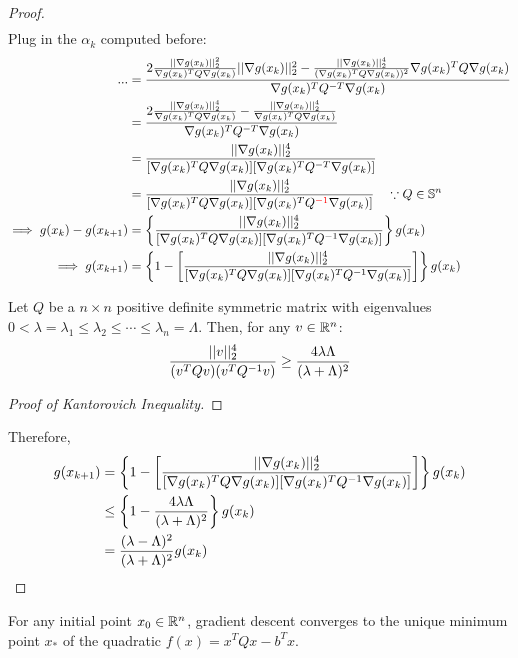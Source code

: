 \documentclass{article}
\begin{document}
\begin{proof}
\begin{align}
		\end{align}
		Plug in the $\alpha_k$ computed before:
		\begin{align}
			... &= \frac{2 \frac{\vert \vert {\nabla g(x_k)} \vert \vert_2^2}{\nabla g(x_k)^T Q \nabla g(x_k)} \vert \vert {\nabla g(x_k)} \vert \vert_2^2 -  \frac{\vert \vert {\nabla g(x_k)} \vert \vert_2^4}{(\nabla g(x_k)^T Q \nabla g(x_k))^2} \nabla g(x_k)^T Q \nabla g(x_k)}{\nabla g(x_k)^T Q^{-T} \nabla g(x_k)} \\
			&= \frac{2 \frac{\vert \vert {\nabla g(x_k)} \vert \vert_2^4}{\nabla g(x_k)^T Q \nabla g(x_k)} - \frac{\vert \vert {\nabla g(x_k)} \vert \vert_2^4}{\nabla g(x_k)^T Q \nabla g(x_k)}}{\nabla g(x_k)^T Q^{-T} \nabla g(x_k)} \\
			&= \frac{\vert \vert {\nabla g(x_k)} \vert \vert_2^4}{[\nabla g(x_k)^T Q \nabla g(x_k)][\nabla g(x_k)^T Q^{-T} \nabla g(x_k)]} \\
			&=\frac{\vert \vert {\nabla g(x_k)} \vert \vert_2^4}{[\nabla g(x_k)^T Q \nabla g(x_k)][\nabla g(x_k)^T Q^{\textcolor{red}{-1}} \nabla g(x_k)]} \quad \because Q \in \mathbb{S}^n \\
			\implies g(x_k) - g(x_{k+1}) &= \left \{
				\frac{\vert \vert {\nabla g(x_k)} \vert \vert_2^4}{[\nabla g(x_k)^T Q \nabla g(x_k)][\nabla g(x_k)^T Q^{-1} \nabla g(x_k)]}
			\right \} g(x_k) \\
			\implies g(x_{k+1}) &= \left \{1 - \left [
				\frac{\vert \vert {\nabla g(x_k)} \vert \vert_2^4}{[\nabla g(x_k)^T Q \nabla g(x_k)][\nabla g(x_k)^T Q^{-1} \nabla g(x_k)]}
			\right ] \right \} g(x_k)
		\end{align}
		\begin{lemma}
			Let $Q$ be a $n\times n$ positive definite symmetric matrix with eigenvalues $0 < \lambda = \lambda_1 \leq \lambda_2 \leq \cdots \leq \lambda_n = \Lambda$. Then, for any $v \in \mathbb{R}^n$:
			\begin{align}
				\frac{\vert \vert {v} \vert \vert^4_2}{(v^T Q v)(v^T Q^{-1} v)} \geq \frac{4 \lambda \Lambda}{(\lambda + \Lambda)^2}
			\end{align}
		\end{lemma}
		\begin{proof}[Proof of Kantorovich Inequality]
		\end{proof}
		Therefore, 
		\begin{align}
			g(x_{k+1}) &= \left \{1 - \left [
				\frac{\vert \vert {\nabla g(x_k)} \vert \vert_2^4}{[\nabla g(x_k)^T Q \nabla g(x_k)][\nabla g(x_k)^T Q^{-1} \nabla g(x_k)]}
			\right ] \right \} g(x_k) \\
			&\leq \left \{1 -  \frac{4 \lambda \Lambda}{(\lambda + \Lambda)^2} \right \} g(x_k) \\
			&= \frac{(\lambda - \Lambda)^2}{(\lambda + \Lambda)^2} g(x_k)
		\end{align}
	\end{proof}
	\begin{theorem}
		For any initial point $x_0 \in \mathbb{R}^n$, gradient descent converges to the unique minimum point $x_*$ of the quadratic $f(x) = x^T Q x - b^T x$.
	\end{theorem}
	
\end{document}
